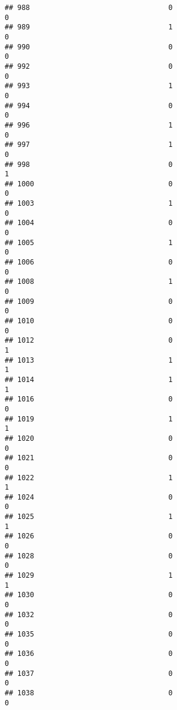 \documentclass[
]{article}
\begin{document}
\begin{verbatim}
## 988                                 0                                0
## 989                                 1                                0
## 990                                 0                                0
## 992                                 0                                0
## 993                                 1                                0
## 994                                 0                                0
## 996                                 1                                0
## 997                                 1                                0
## 998                                 0                                1
## 1000                                0                                0
## 1003                                1                                0
## 1004                                0                                0
## 1005                                1                                0
## 1006                                0                                0
## 1008                                1                                0
## 1009                                0                                0
## 1010                                0                                0
## 1012                                0                                1
## 1013                                1                                1
## 1014                                1                                1
## 1016                                0                                0
## 1019                                1                                1
## 1020                                0                                0
## 1021                                0                                0
## 1022                                1                                1
## 1024                                0                                0
## 1025                                1                                1
## 1026                                0                                0
## 1028                                0                                0
## 1029                                1                                1
## 1030                                0                                0
## 1032                                0                                0
## 1035                                0                                0
## 1036                                0                                0
## 1037                                0                                0
## 1038                                0                                0

\end{verbatim}
\end{document}
